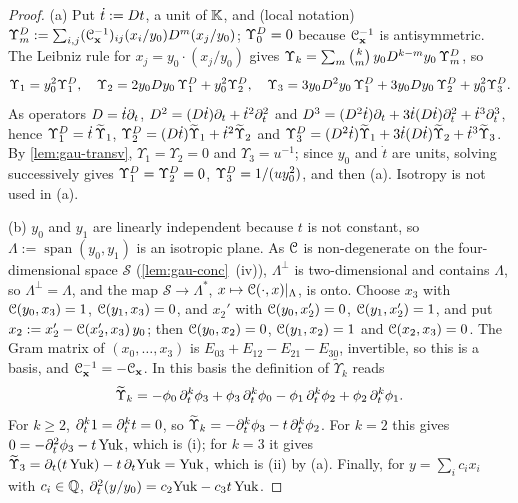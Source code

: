 \begin{proof}
(a) Put $\dot t:=D t$, a unit of $\mathbb{K}$, and (local notation) $\Upsilon^{D}_m:=\sum_{i,j}(\mathcal{C}_{\mathbf x}^{-1})_{ij}(x_i/y_0)D^m(x_j/y_0)$; $\Upsilon^{D}_0=0$ because $\mathcal{C}_{\mathbf x}^{-1}$ is antisymmetric. The Leibniz rule for $x_j=y_0\cdot(x_j/y_0)$ gives $\Upsilon_k=\sum_m\binom km\,y_0D^{k-m}y_0\,\Upsilon^{D}_m$, so
\[
\Upsilon_1=y_0^2\Upsilon^{D}_1,\quad \Upsilon_2=2y_0D y_0\,\Upsilon^{D}_1+y_0^2\Upsilon^{D}_2,\quad \Upsilon_3=3y_0D^2y_0\,\Upsilon^{D}_1+3y_0D y_0\,\Upsilon^{D}_2+y_0^2\Upsilon^{D}_3 .
\]
As operators $D=\dot t\partial_t$, $D^2=(D\dot t)\partial_t+\dot t^2\partial_t^2$ and $D^3=(D^2\dot t)\partial_t+3\dot t(D\dot t)\partial_t^2+\dot t^3\partial_t^3$, hence $\Upsilon^{D}_1=\dot t\,\widetilde\Upsilon_1$, $\Upsilon^{D}_2=(D\dot t)\widetilde\Upsilon_1+\dot t^2\widetilde\Upsilon_2$ and $\Upsilon^{D}_3=(D^2\dot t)\widetilde\Upsilon_1+3\dot t(D\dot t)\widetilde\Upsilon_2+\dot t^3\widetilde\Upsilon_3$. By \cref{lem:gau-transv}, $\Upsilon_1=\Upsilon_2=0$ and $\Upsilon_3=u^{-1}$; since $y_0$ and $\dot t$ are units, solving successively gives $\Upsilon^{D}_1=\Upsilon^{D}_2=0$, $\Upsilon^{D}_3=1/(uy_0^2)$, and then (a). Isotropy is not used in (a).

(b) $y_0$ and $y_1$ are linearly independent because $t$ is not constant, so $\Lambda:=\operatorname{span}(y_0,y_1)$ is an isotropic plane. As $\mathcal{C}$ is non-degenerate on the four-dimensional space $\mathcal S$ (\cref{lem:gau-conc}~(iv)), $\Lambda^\perp$ is two-dimensional and contains $\Lambda$, so $\Lambda^\perp=\Lambda$, and the map $\mathcal S\to\Lambda^*$, $x\mapsto\mathcal{C}(\cdot,x)|_\Lambda$, is onto. Choose $x_3$ with $\mathcal{C}(y_0,x_3)=1$, $\mathcal{C}(y_1,x_3)=0$, and $x_2'$ with $\mathcal{C}(y_0,x_2')=0$, $\mathcal{C}(y_1,x_2')=1$, and put $x_2:=x_2'-\mathcal{C}(x_2',x_3)\,y_0$; then $\mathcal{C}(y_0,x_2)=0$, $\mathcal{C}(y_1,x_2)=1$ and $\mathcal{C}(x_2,x_3)=0$. The Gram matrix of $(x_0,\dots,x_3)$ is $E_{03}+E_{12}-E_{21}-E_{30}$, invertible, so this is a basis, and $\mathcal{C}_{\mathbf x}^{-1}=-\mathcal{C}_{\mathbf x}$. In this basis the definition of $\widetilde\Upsilon_k$ reads
\[
\widetilde\Upsilon_k=-\phi_0\,\partial_t^k\phi_3+\phi_3\,\partial_t^k\phi_0-\phi_1\,\partial_t^k\phi_2+\phi_2\,\partial_t^k\phi_1 .
\]
For $k\geq2$, $\partial_t^k1=\partial_t^kt=0$, so $\widetilde\Upsilon_k=-\partial_t^k\phi_3-t\,\partial_t^k\phi_2$. For $k=2$ this gives $0=-\partial_t^2\phi_3-t\,\mathrm{Yuk}$, which is (i); for $k=3$ it gives $\widetilde\Upsilon_3=\partial_t(t\,\mathrm{Yuk})-t\,\partial_t\mathrm{Yuk}=\mathrm{Yuk}$, which is (ii) by (a). Finally, for $y=\sum_ic_ix_i$ with $c_i\in\mathbb{Q}$, $\partial_t^2(y/y_0)=c_2\mathrm{Yuk}-c_3t\,\mathrm{Yuk}$.
\end{proof}

